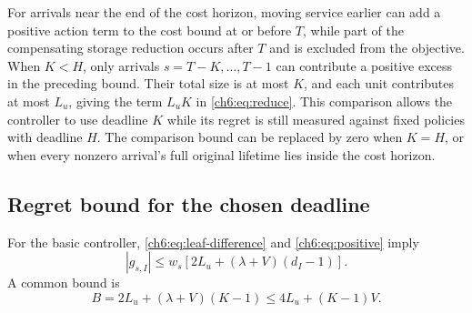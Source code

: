 \documentclass[11pt]{article}
\theoremstyle{plain}
\theoremstyle{remark}
\numberwithin{equation}{section}
\begin{document}
For arrivals near the end of the cost horizon, moving service earlier can
add a positive action term to the cost bound at or before $T$, while part
of the compensating storage reduction occurs after $T$ and is excluded
from the objective. When $K<H$, only arrivals $s=T-K,\ldots,T-1$ can
contribute a positive excess in the preceding bound. Their total size is at
most $K$, and each unit contributes at most $L_u$, giving the term $L_uK$ in
\eqref{ch6:eq:reduce}. This comparison allows the controller to use deadline
$K$ while its regret is still measured against fixed policies with deadline
$H$. The comparison bound can be replaced by zero when $K=H$, or when
every nonzero arrival's full original lifetime lies inside the cost horizon.

\subsection{Regret bound for the chosen deadline}
For the basic controller, \eqref{ch6:eq:leaf-difference} and
\eqref{ch6:eq:positive} imply
\begin{equation}\label{ch6:eq:positive-node}
 |g_{s,I}|\le w_s[2L_u+(\lambda+V)(d_I-1)].
\end{equation}
A common bound is
\begin{equation}\label{ch6:eq:positive-B}
 B=2L_u+(\lambda+V)(K-1)\le4L_u+(K-1)V.
\end{equation}
\end{document}
